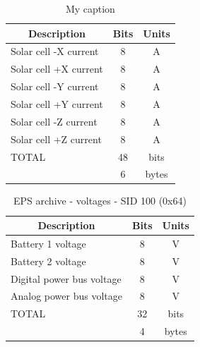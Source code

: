 \begin{apendicesenv}
\begin{table}[]
\centering
\caption{My caption}
\label{my-label}
\begin{tabular}{@{}lcc@{}}
\toprule
\multicolumn{1}{c}{Description} & Bits & Units                      \\ \midrule
Solar cell -X current           & 8    & A                          \\
Solar cell +X current           & 8    & A                          \\
Solar cell -Y current           & 8    & A                          \\
Solar cell +Y current           & 8    & A                          \\
Solar cell -Z current           & 8    & A                          \\
Solar cell +Z current           & 8    & A                          \\ \midrule
\multicolumn{1}{|l|}{TOTAL}      & 48   & \multicolumn{1}{c|}{bits}  \\
\multicolumn{1}{|l|}{}           & 6    & \multicolumn{1}{c|}{bytes} \\ \bottomrule
\end{tabular}
\end{table}

\begin{table}[h]
\centering
\caption{EPS archive - voltages - SID 100 (0x64)}
\label{my-label}
\begin{tabular}{@{}lcc@{}}
\toprule
\multicolumn{1}{c}{Description} & Bits & Units                      \\ \midrule
Battery 1 voltage               & 8    & V                          \\
Battery 2 voltage               & 8    & V                          \\
Digital power bus voltage       & 8    & V                          \\
Analog power bus voltage        & 8    & V                          \\ \midrule
\multicolumn{1}{|l|}{TOTAL}      & 32   & \multicolumn{1}{c|}{bits}  \\
\multicolumn{1}{|l|}{}           & 4    & \multicolumn{1}{c|}{bytes} \\ \bottomrule
\end{tabular}
\end{table}


\end{apendicesenv}
